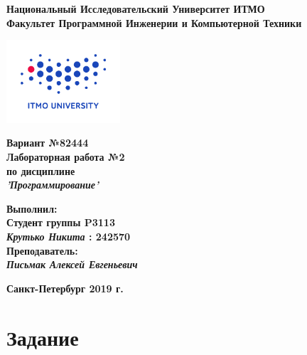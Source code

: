 \documentclass[11pt]{article}
\author{Krutko Nikita / KrutNA}
\date{\today}
\title{}
\begin{document}
\large
\thispagestyle{empty}
\begin{center}
\textbf{Национальный Исследовательский Университет ИТМО}\\
\textbf{Факультет Программной Инженерии и Компьютерной Техники}\\
\end{center}
\vspace{2em}
\begin{center}
\includegraphics[width=120pt]{itmo-logo.png}
\end{center}
\LARGE
\vspace{5em}
\begin{center}
\textbf{Вариант №82444}\\
\textbf{Лабораторная работа №2}\\
\Large
\textbf{по дисциплине}\\
\LARGE
\textbf{\emph{'Программирование'}}\\
\end{center}
\vspace{11em}
\large
\begin{flushright}
\textbf{Выполнил:}\\
\textbf{Студент группы P3113}\\
\textbf{\emph{Крутько Никита} : 242570}\\
\textbf{Преподаватель:}\\
\textbf{\emph{Письмак Алексей Евгеньевич}}\\
\end{flushright}
\vspace{4em}
\large
\begin{center}
\textbf{Санкт-Петербург 2019 г.}
\end{center}
\pagebreak{}
\setcounter{tocdepth}{3}
\tableofcontents
\vspace{2em}
\newfontfamily{}
\newfontfamily{}
\lstset{
  frame = shadowbox,
  commentstyle = \lstcomment\it\small,
  basicstyle = \lstbasic\small,
  numberstyle = \lstbasic\tiny,numbers=left,
  stringstyle = \lstbasic\it\small,
}
\section{Задание}
\label{sec:org1f20b90}
\end{document}
